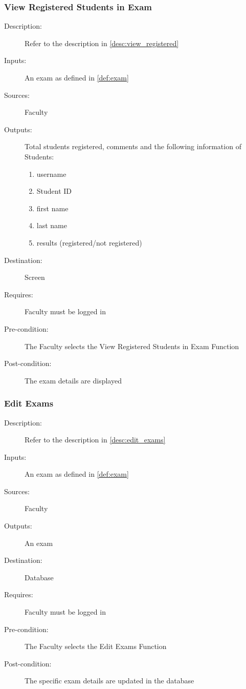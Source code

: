 \subsubsection{\large View Registered Students in Exam} 
\begin{boxed} %
\begin{description}
\item[Description:]
   Refer to the description in \autoref{desc:view_registered}
\item[Inputs:]
   An exam as defined in \autoref{def:exam}
\item[Sources:]
   Faculty
\item[Outputs:]
   Total students registered, comments and the following information of
   Students:
   \begin{enumerate}
      \item username
      \item Student ID
      \item first name
      \item last name
      \item results (registered/not registered)
   \end{enumerate}
\item[Destination:]
   Screen
\item[Requires:]
   Faculty must be logged in
\item[Pre-condition:]
   The Faculty selects the View Registered Students in Exam Function
\item[Post-condition:]
   The exam details are displayed
\end{description}
\end{boxed} %

\subsubsection{\large Edit Exams} 
\begin{boxed} %
\begin{description}
\item[Description:]
   Refer to the description in \autoref{desc:edit_exams}
\item[Inputs:]
   An exam as defined in \autoref{def:exam}
\item[Sources:]
   Faculty
\item[Outputs:]
   An exam
\item[Destination:]
   Database
\item[Requires:]
   Faculty must be logged in
\item[Pre-condition:]
   The Faculty selects the Edit Exams Function
\item[Post-condition:]
   The specific exam details are updated in the database
\end{description}
\end{boxed} %

